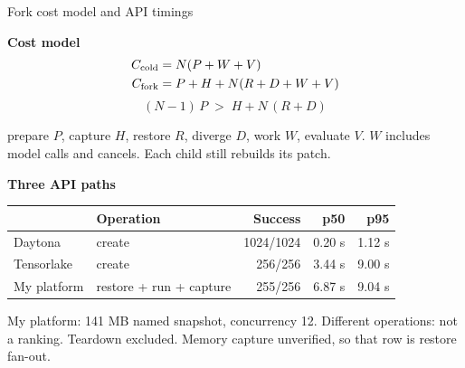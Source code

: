 \begin{frame}[t]{\ev{\tagM\,\tagP}Fork cost model and API timings}
\vspace{0pt}
\noindent\begin{minipage}[t]{.43\textwidth}
\textbf{Cost model} \tagP
\[\begin{aligned}C_{\rm cold}&=N(P+W+V)\\ C_{\rm fork}&=P+H+N(R+D+W+V)\end{aligned}\]
\[(N-1)\,P \;>\; H + N\,(R+D)\]
{\footnotesize prepare $P$, capture $H$, restore $R$, diverge $D$, work $W$, evaluate $V$. $W$ includes model calls and cancels. Each child still rebuilds its patch.\par}
\end{minipage}\hfill
\begin{minipage}[t]{.52\textwidth}
\textbf{Three API paths} \tagM\\[3pt]
{\scriptsize\renewcommand{\arraystretch}{1.1}\setlength{\tabcolsep}{3pt}
\begin{tabularx}{\linewidth}{@{}l Y r r r@{}}
\toprule
& Operation & Success & p50 & p95\\
\midrule
Daytona & create & 1024/1024 & 0.20 s & 1.12 s\\
Tensorlake & create & 256/256 & 3.44 s & 9.00 s\\
My platform & restore + run + capture & 255/256 & 6.87 s & 9.04 s\\
\bottomrule
\end{tabularx}\par}
\vspace{.1cm}
{\footnotesize\color{Muted}My platform: 141 MB named snapshot, concurrency 12. Different operations: not a ranking. Teardown excluded. Memory capture unverified, so that row is restore fan-out.\par}
\end{minipage}
\end{frame}
